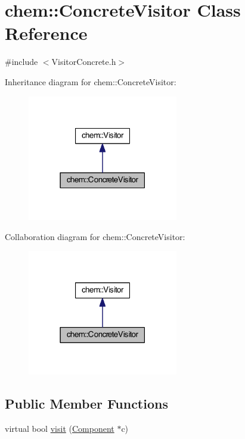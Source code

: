 \hypertarget{classchem_1_1ConcreteVisitor}{\section{chem\-:\-:Concrete\-Visitor Class Reference}
\label{classchem_1_1ConcreteVisitor}
}


{\ttfamily \#include $<$Visitor\-Concrete.\-h$>$}



Inheritance diagram for chem\-:\-:Concrete\-Visitor\-:\nopagebreak
\begin{figure}[H]
\begin{center}
\leavevmode
\includegraphics[width=186pt]{classchem_1_1ConcreteVisitor__inherit__graph}
\end{center}
\end{figure}


Collaboration diagram for chem\-:\-:Concrete\-Visitor\-:\nopagebreak
\begin{figure}[H]
\begin{center}
\leavevmode
\includegraphics[width=186pt]{classchem_1_1ConcreteVisitor__coll__graph}
\end{center}
\end{figure}
\subsection*{Public Member Functions}
\begin{DoxyCompactItemize}
\item 
virtual bool \hyperlink{classchem_1_1ConcreteVisitor_abb5892cdcf90fef25aafafaf81baa697}{visit} (\hyperlink{classchem_1_1Component}{Component} $\ast$c)
\end{DoxyCompactItemize}


